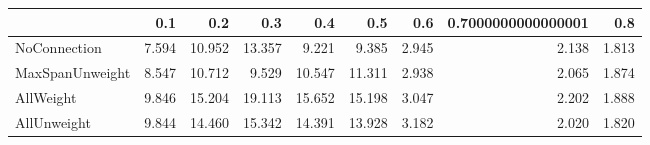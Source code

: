 \begin{tabular}{lrrrrrrrr}
\toprule
{} &   0.1 &    0.2 &    0.3 &    0.4 &    0.5 &   0.6 & 0.7000000000000001 &   0.8 \\
\midrule
NoConnection    & 7.594 & 10.952 & 13.357 &  9.221 &  9.385 & 2.945 &              2.138 & 1.813 \\
MaxSpanUnweight & 8.547 & 10.712 &  9.529 & 10.547 & 11.311 & 2.938 &              2.065 & 1.874 \\
AllWeight       & 9.846 & 15.204 & 19.113 & 15.652 & 15.198 & 3.047 &              2.202 & 1.888 \\
AllUnweight     & 9.844 & 14.460 & 15.342 & 14.391 & 13.928 & 3.182 &              2.020 & 1.820 \\
\bottomrule
\end{tabular}
